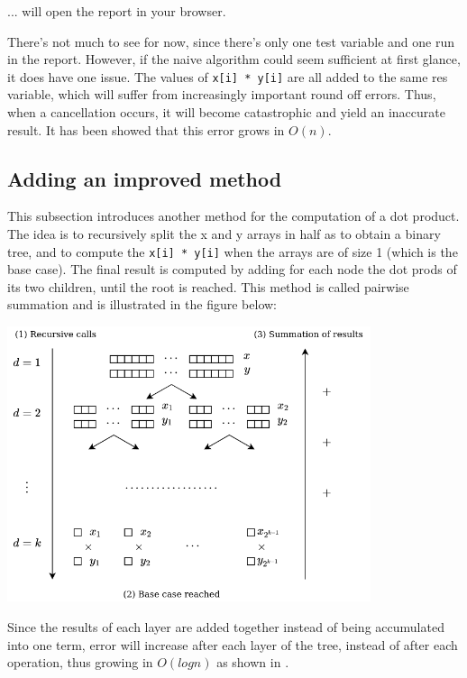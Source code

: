 ... will open the report in your browser.

There's not much to see for now, since there's only one test variable and one
run in the report. However, if the naive algorithm could seem sufficient at
first glance, it does have one issue. The values of \texttt{x[i] * y[i]}
are all added to the same res variable, which will suffer from increasingly
important round off errors. Thus, when a cancellation occurs, it will become
catastrophic and yield an inaccurate result. It has been showed that this error
grows in $O(n)$.


\subsection{Adding an improved method}

This subsection introduces another method for the computation of a dot product.
The idea is to recursively split the x and y arrays in half as to obtain a
binary tree, and to compute the \texttt{x[i] * y[i]} when the arrays are
of size 1 (which is the base case). The final result is computed by adding for
each node the dot prods of its two children, until the root is reached. This
method is called pairwise summation and is illustrated in the figure below:

\bigbreak

\begin{center}
\includegraphics[width=0.8\textwidth]{images/recursive_dotprod.png}
\end{center}

Since the results of each layer are added together instead of being accumulated into one term, error will increase after each layer of the tree, instead of after each operation, thus growing in $O(log n)$ as shown in \cite{higham}.


